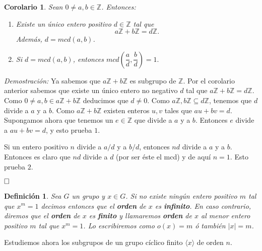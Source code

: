 \documentclass[12pt]{article}
\newtheorem{definition}[theorem]{Definición}
\newtheorem{corolario}{Corolario}[theorem]
\begin{document}
\begin{corolario}Sean $0\neq a,b \in \mathbb{Z}$. Entonces:
\begin{enumerate}
\item Existe un único entero positivo $d \in \mathbb{Z}$ tal que $$a\mathbb{Z}+b\mathbb{Z} = d\mathbb{Z}.$$ Además, $d = mcd(a,b)$.
\item Si $d = mcd(a,b)$, entonces $mcd \left(\dfrac{a}{d}, \dfrac{b}{d} \right) = 1.$
\end{enumerate}
\end{corolario}
\emph{Demostración: }Ya sabemos que $a\mathbb{Z}+b\mathbb{Z}$ es subgrupo de $\mathbb{Z}$. Por el corolario anterior sabemos que existe un único entero no negativo $d$ tal que $a\mathbb{Z}+b\mathbb{Z} = d\mathbb{Z}$. Como $0\neq a,b \in a\mathbb{Z}+b\mathbb{Z}$ deducimos que $d\neq 0$. Como $a\mathbb{Z}, b\mathbb{Z} \subseteq d\mathbb{Z}$, tenemos que $d$ divide a $a$ y a $b$. Como $a\mathbb{Z}+b\mathbb{Z}$ existen enteros $u,v$ tales que $au+bv = d$. Supongamos ahora que tenemos un $e\in \mathbb{Z}$ que divide a $a$ y a $b$. Entonces $e$ divide a $au+bv = d$, y esto prueba $1.$

Si un entero positivo $n$ divide a $a/d$ y a $b/d$, entonces $nd$ divide a $a$ y a $b$. Entonces es claro que $nd$ divide a $d$ (por ser éste el mcd) y de aquí $n=1$. Esto prueba $2.$

$\hfill \square$

\begin{definition}Sea $G$ un grupo y $x \in G$. Si no existe ningún entero positivo $m$ tal que $x^m=1$ decimos entonces que el \textbf{orden} de $x$ es \textbf{infinito}. En caso contrario, diremos que el \textbf{orden} de $x$ es \textbf{finito} y llamaremos \textbf{orden} de $x$ al menor entero positivo $m$ tal que $x^m =1$. Lo escribiremos como $o(x) = m$ ó también $|x| = m$.
\end{definition}

Estudiemos ahora los subgrupos de un grupo cíclico finito $\langle x \rangle$ de orden $n$.
\end{document}
